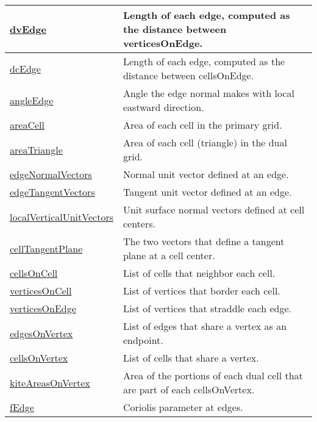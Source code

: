 {\begin{center}
\begin{longtable}{| p{2.0in} | p{4.0in} |}
    \hline
    \hyperref[subsec:var_sec_mesh_dvEdge]{dvEdge} & Length of each edge, computed as the distance between verticesOnEdge. \\
    \hline
    \hyperref[subsec:var_sec_mesh_dcEdge]{dcEdge} & Length of each edge, computed as the distance between cellsOnEdge. \\
    \hline
    \hyperref[subsec:var_sec_mesh_angleEdge]{angleEdge} & Angle the edge normal makes with local eastward direction. \\
    \hline
    \hyperref[subsec:var_sec_mesh_areaCell]{areaCell} & Area of each cell in the primary grid. \\
    \hline
    \hyperref[subsec:var_sec_mesh_areaTriangle]{areaTriangle} & Area of each cell (triangle) in the dual grid. \\
    \hline
    \hyperref[subsec:var_sec_mesh_edgeNormalVectors]{edgeNormalVectors} & Normal unit vector defined at an edge. \\
    \hline
    \hyperref[subsec:var_sec_mesh_edgeTangentVectors]{edgeTangentVectors} & Tangent unit vector defined at an edge. \\
    \hline
    \hyperref[subsec:var_sec_mesh_localVerticalUnitVectors]{localVerticalUnitVectors} & Unit surface normal vectors defined at cell centers. \\
    \hline
    \hyperref[subsec:var_sec_mesh_cellTangentPlane]{cellTangentPlane} & The two vectors that define a tangent plane at a cell center. \\
    \hline
    \hyperref[subsec:var_sec_mesh_cellsOnCell]{cellsOnCell} & List of cells that neighbor each cell. \\
    \hline
    \hyperref[subsec:var_sec_mesh_verticesOnCell]{verticesOnCell} & List of vertices that border each cell. \\
    \hline
    \hyperref[subsec:var_sec_mesh_verticesOnEdge]{verticesOnEdge} & List of vertices that straddle each edge. \\
    \hline
    \hyperref[subsec:var_sec_mesh_edgesOnVertex]{edgesOnVertex} & List of edges that share a vertex as an endpoint. \\
    \hline
    \hyperref[subsec:var_sec_mesh_cellsOnVertex]{cellsOnVertex} & List of cells that share a vertex. \\
    \hline
    \hyperref[subsec:var_sec_mesh_kiteAreasOnVertex]{kiteAreasOnVertex} & Area of the portions of each dual cell that are part of each cellsOnVertex. \\
    \hline
    \hyperref[subsec:var_sec_mesh_fEdge]{fEdge} & Coriolis parameter at edges. \\

\end{longtable}
\end{center}}
